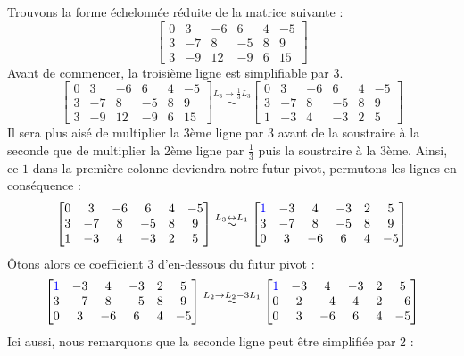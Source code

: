 \documentclass{article}
\begin{document}
\noindent Trouvons la forme échelonnée réduite de la matrice suivante :
$$
\begin{bmatrix}
 0 &  3 & -6 &  6 &  4 & -5\\
 3 & -7 &  8 & -5 &  8 &  9\\
 3 & -9 & 12 & -9 &  6 & 15
\end{bmatrix}
$$
Avant de commencer, la troisième ligne est simplifiable par 3.
$$
\begin{bmatrix}
 0 &  3 & -6 &  6 &  4 & -5\\
 3 & -7 &  8 & -5 &  8 &  9\\
 3 & -9 & 12 & -9 &  6 & 15
\end{bmatrix}
\overset{L_3 \to \frac{1}{3}L_3}{\sim}
\begin{bmatrix}
 0 &  3 & -6 &  6 &  4 & -5\\
 3 & -7 &  8 & -5 &  8 &  9\\
 1 & -3 &  4 & -3 &  2 & 5
\end{bmatrix}
$$
Il sera plus aisé de multiplier la 3ème ligne par 3 avant de la soustraire à la seconde que de multiplier la 2ème ligne par $\frac{1}{3}$ puis la soustraire à la 3ème. Ainsi, ce $1$ dans la première colonne deviendra notre futur pivot, permutons les lignes en conséquence :
$$
\begin{bmatrix}
 0 &  3 & -6 &  6 &  4 & -5\\
 3 & -7 &  8 & -5 &  8 &  9\\
 1 & -3 &  4 & -3 &  2 & 5
\end{bmatrix}
\overset{L_3 \leftrightarrow L_1}{\sim}
\begin{bmatrix}
 \color{blue}1 & -3 &  4 & -3 &  2 & 5\\
 3 & -7 &  8 & -5 &  8 &  9\\
 0 &  3 & -6 &  6 &  4 & -5
\end{bmatrix}
$$
Ôtons alors ce coefficient $3$ d'en-dessous du futur pivot :
$$
\begin{bmatrix}
 \color{blue}1 & -3 &  4 & -3 &  2 & 5\\
 3 & -7 &  8 & -5 &  8 &  9\\
 0 &  3 & -6 &  6 &  4 & -5
\end{bmatrix}
\overset{L_2 \to L_2 - 3L_1}{\sim}
\begin{bmatrix}
 \color{blue}1 & -3 &  4 & -3 &  2 & 5\\
 0 & 2 &  -4 & 4 &  2 &  -6\\
 0 &  3 & -6 &  6 &  4 & -5
\end{bmatrix}
$$
Ici aussi, nous remarquons que la seconde ligne peut être simplifiée par 2 :
\end{document}

